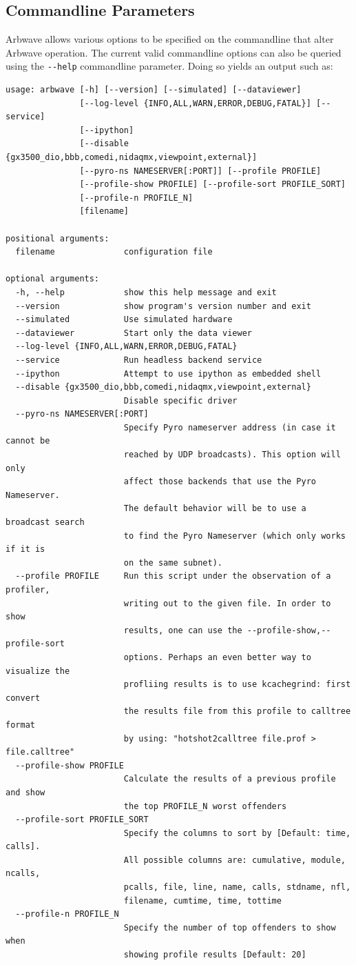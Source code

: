 \subsection{Commandline Parameters}\label{sec:overview:cmdline}
Arbwave allows various options to be specified on the commandline that alter
Arbwave operation.  The current valid commandline options can also be queried
using the \verb|--help| commandline parameter.  Doing so yields an output such
as:
\begin{verbatim}
usage: arbwave [-h] [--version] [--simulated] [--dataviewer]
               [--log-level {INFO,ALL,WARN,ERROR,DEBUG,FATAL}] [--service]
               [--ipython]
               [--disable {gx3500_dio,bbb,comedi,nidaqmx,viewpoint,external}]
               [--pyro-ns NAMESERVER[:PORT]] [--profile PROFILE]
               [--profile-show PROFILE] [--profile-sort PROFILE_SORT]
               [--profile-n PROFILE_N]
               [filename]

positional arguments:
  filename              configuration file

optional arguments:
  -h, --help            show this help message and exit
  --version             show program's version number and exit
  --simulated           Use simulated hardware
  --dataviewer          Start only the data viewer
  --log-level {INFO,ALL,WARN,ERROR,DEBUG,FATAL}
  --service             Run headless backend service
  --ipython             Attempt to use ipython as embedded shell
  --disable {gx3500_dio,bbb,comedi,nidaqmx,viewpoint,external}
                        Disable specific driver
  --pyro-ns NAMESERVER[:PORT]
                        Specify Pyro nameserver address (in case it cannot be
                        reached by UDP broadcasts). This option will only
                        affect those backends that use the Pyro Nameserver.
                        The default behavior will be to use a broadcast search
                        to find the Pyro Nameserver (which only works if it is
                        on the same subnet).
  --profile PROFILE     Run this script under the observation of a profiler,
                        writing out to the given file. In order to show
                        results, one can use the --profile-show,--profile-sort
                        options. Perhaps an even better way to visualize the
                        profliing results is to use kcachegrind: first convert
                        the results file from this profile to calltree format
                        by using: "hotshot2calltree file.prof > file.calltree"
  --profile-show PROFILE
                        Calculate the results of a previous profile and show
                        the top PROFILE_N worst offenders
  --profile-sort PROFILE_SORT
                        Specify the columns to sort by [Default: time, calls].
                        All possible columns are: cumulative, module, ncalls,
                        pcalls, file, line, name, calls, stdname, nfl,
                        filename, cumtime, time, tottime
  --profile-n PROFILE_N
                        Specify the number of top offenders to show when
                        showing profile results [Default: 20]
\end{verbatim}

